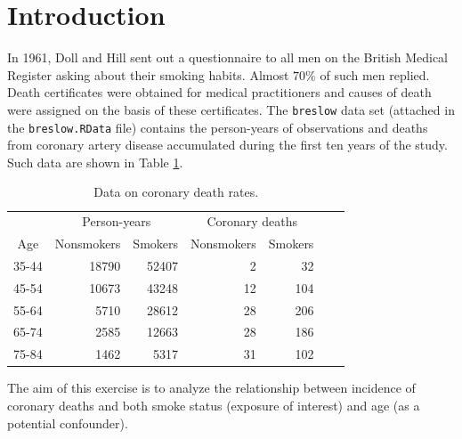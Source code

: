 \documentclass[10pt,a4paper,twoside]{article}\usepackage[]{graphicx}\usepackage[]{xcolor}
\newcommand{\Robject}[1]{\texttt{#1}}
\begin{document}


\clearpage
\tableofcontents
\clearpage




\section{Introduction}
\label{sec:intro}
In 1961, Doll and Hill\cite{ref1} sent out a questionnaire to all men on the British Medical Register asking about their smoking habits. Almost $70\%$ of such men replied. Death certificates were obtained for medical practitioners and causes of death were assigned on the basis of these certificates. The \Robject{breslow} data set\cite{ref2} (attached in the \Robject{breslow.RData} file) contains the person-years of observations and deaths from coronary artery disease accumulated during the first ten years of the study. Such data are shown in Table \ref{tab:table1}.



\begin{table}[h]
\centering
\begin{tabular}{crrrrrr}
\toprule
\multicolumn{1}{c}{ } & \multicolumn{2}{c}{Person-years} & \multicolumn{2}{c}{Coronary deaths} \\
\cmidrule(l{3pt}r{3pt}){2-3} \cmidrule(l{3pt}r{3pt}){4-5}
Age & Nonsmokers & Smokers & Nonsmokers & Smokers \\
\midrule
35-44 & 18790 & 52407  & 2 & 32\\
45-54 & 10673 & 43248  & 12 & 104\\
55-64 & 5710 & 28612  & 28 & 206\\
65-74 & 2585 & 12663  & 28 & 186\\
75-84 & 1462 & 5317 & 31 & 102\\
\bottomrule
\end{tabular}
\caption{Data on coronary death rates.}
\label{tab:table1}
\end{table}

The aim of this exercise is to analyze the relationship between incidence of coronary deaths and both smoke status (exposure of interest) and age (as a potential confounder).


\end{document}
